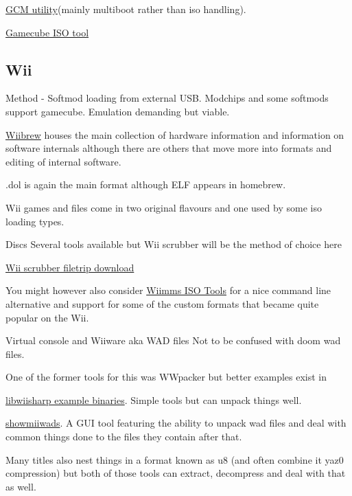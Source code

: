 \documentclass[
]{book}
\begin{document}
\href{http://filetrip.net/wii-downloads/other-files/download-gcmutility-05-f606.html}{GCM utility}(mainly multiboot rather than iso handling).

\href{http://filetrip.net/wii-downloads/tools-utilities/latest-gamecube-iso-tool-f28774.html}{Gamecube ISO tool}

\hypertarget{wii}{%
\subsection{Wii}\label{wii}}

Method - Softmod loading from external USB. Modchips and some softmods support gamecube. Emulation demanding but viable.

\href{http://wiibrew.org/wiki/Wii_Hardware}{Wiibrew} houses the main collection of hardware information and information on software internals although there are others that move more into formats and editing of internal software.

.dol is again the main format although ELF appears in homebrew.

Wii games and files come in two original flavours and one used by some iso loading types.

Discs Several tools available but Wii scrubber will be the method of choice here

\href{http://filetrip.net/wii-downloads/other-files/download-wiiscrubber-kit-with-multiloader-140-f4399.html}{Wii scrubber filetrip download}

You might however also consider \href{http://wit.wiimm.de/}{Wiimms ISO Tools} for a nice command line alternative and support for some of the custom formats that became quite popular on the Wii.

Virtual console and Wiiware aka WAD files Not to be confused with doom wad files.

One of the former tools for this was WWpacker but better examples exist in

\href{https://code.google.com/p/libwiisharp/}{libwiisharp example binaries}. Simple tools but can unpack things well.

\href{http://code.google.com/p/showmiiwads/}{showmiiwads}. A GUI tool featuring the ability to unpack wad files and deal with common things done to the files they contain after that.

Many titles also nest things in a format known as u8 (and often combine it yaz0 compression) but both of those tools can extract, decompress and deal with that as well.
\end{document}
